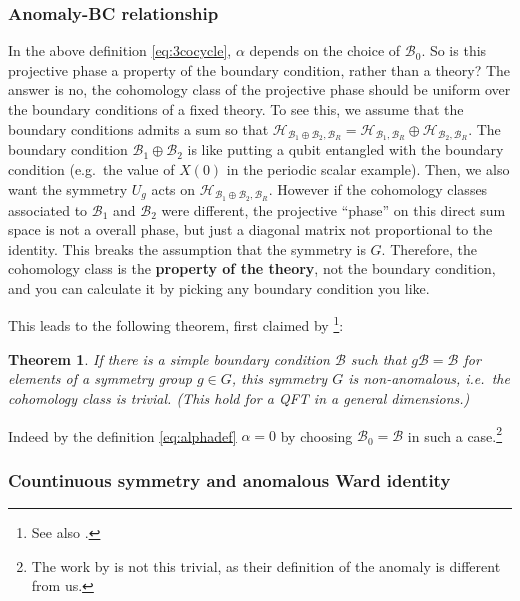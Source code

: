 \documentclass[
]{scrartcl}
\numberwithin{equation}{section}
\newtheorem{theorem}{Theorem}[section]
\theoremstyle{definition}
\theoremstyle{definition}
\theoremstyle{definition}
\theoremstyle{definition}
\theoremstyle{remark}
\begin{document}
\hypertarget{anomaly-bc-relationship}{%
\subsubsection{Anomaly-BC relationship}\label{anomaly-bc-relationship}}

In the above definition \eqref{eq:3cocycle}, \(\alpha\) depends on the choice of \(\mathcal{B}_0\). So is this projective phase a property of the boundary condition, rather than a theory?
The answer is no, the cohomology class of the projective phase should be uniform over the boundary conditions of a fixed theory.
To see this, we assume that the boundary conditions admits a sum so that \(\mathcal{H}_{\mathcal{B}_1\oplus \mathcal{B}_2,\mathcal{B}_R} = \mathcal{H}_{\mathcal{B}_1,\mathcal{B}_R} \oplus \mathcal{H}_{\mathcal{B}_2,\mathcal{B}_R}\).
The boundary condition \(\mathcal{B}_1\oplus \mathcal{B}_2\) is like
putting a qubit entangled with the boundary condition (e.g.~the value of \(X(0)\) in the periodic scalar example).
Then, we also want the symmetry \(U_g\) acts on \(\mathcal{H}_{\mathcal{B}_1\oplus \mathcal{B}_2,\mathcal{B}_R}\).
However if the cohomology classes associated to \(\mathcal{B}_1\) and \(\mathcal{B}_2\) were different, the projective ``phase'' on this direct sum space is not a overall phase, but just a diagonal matrix not proportional to the identity. This breaks the assumption that the symmetry is \(G\).
Therefore, the cohomology class is the \textbf{property of the theory}, not the boundary condition, and you can calculate it by picking any boundary condition you like.

This leads to the following theorem, first claimed by \textcite{Thorngren:2020yht} \footnote{See also \textcite{Hellerman:2021fla}.}:

\begin{theorem}
If there is a simple boundary condition \(\mathcal{B}\) such that \(g \mathcal{B} =\mathcal{B}\) for elements of a symmetry group \(g\in G\), this symmetry \(G\) is non-anomalous, i.e.~the cohomology class is trivial.
(This hold for a QFT in a general dimensions.)
\end{theorem}

Indeed by the definition \eqref{eq:alphadef} \(\alpha = 0\) by choosing \(\mathcal{B}_0 = \mathcal{B}\) in such a case.\footnote{The work by \textcite{Thorngren:2020yht} is not this trivial, as their definition of the anomaly is different from us.}

\hypertarget{countinuous-symmetry-and-anomalous-ward-identity}{%
\subsubsection{Countinuous symmetry and anomalous Ward identity}\label{countinuous-symmetry-and-anomalous-ward-identity}}
\end{document}
